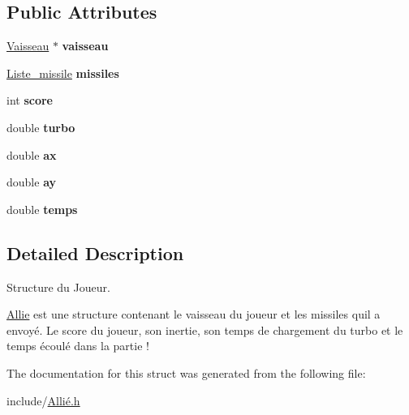 \subsection*{Public Attributes}
\begin{DoxyCompactItemize}
\item 
\mbox{\label{struct_allie_afc1a96eb2646a96142be795bccdc5af0}} 
\hyperlink{struct_vaisseau}{Vaisseau} $\ast$ {\bfseries vaisseau}
\item 
\mbox{\label{struct_allie_acb7ca6eced9318237599c270317ea9ff}} 
\hyperlink{struct_liste__missile}{Liste\+\_\+missile} {\bfseries missiles}
\item 
\mbox{\label{struct_allie_ada02154a7676fa5f5edaea1247be7408}} 
int {\bfseries score}
\item 
\mbox{\label{struct_allie_a803ab852db1feb6e5300ecb717c76a20}} 
double {\bfseries turbo}
\item 
\mbox{\label{struct_allie_a4c7d3bafd6e1f527592b9cecf469f15c}} 
double {\bfseries ax}
\item 
\mbox{\label{struct_allie_aaa0bfd6b20c4d80c7b30f498f00ecbd1}} 
double {\bfseries ay}
\item 
\mbox{\label{struct_allie_ad96e178fc75f902ca31544fdae784666}} 
double {\bfseries temps}
\end{DoxyCompactItemize}


\subsection{Detailed Description}
Structure du Joueur. 

\hyperlink{struct_allie}{Allie} est une structure contenant le vaisseau du joueur et les missiles qu\textquotesingle{}il a envoyé. Le score du joueur, son inertie, son temps de chargement du turbo et le temps écoulé dans la partie ! 

The documentation for this struct was generated from the following file\+:\begin{DoxyCompactItemize}
\item 
include/\hyperlink{_alli_xC3_xA9_8h}{Allié.\+h}\end{DoxyCompactItemize}
